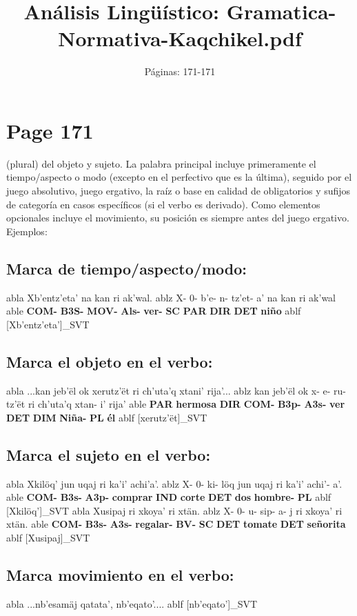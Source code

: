 \documentclass{article}%
\title{Análisis Lingüístico: Gramatica{-}Normativa{-}Kaqchikel.pdf}%
\author{Páginas: 171{-}171}%
\begin{document}
%
\normalsize%
\maketitle%
\section{Page 171}%
\label{sec:Page171}%

%
(plural) del objeto y sujeto. La palabra principal incluye primeramente el tiempo/aspecto %
o modo (excepto en el perfectivo que es la última), seguido por el juego absolutivo, %
juego ergativo, la raíz o base en calidad de obligatorios y sufijos de categoría en casos %
específicos (si el verbo es derivado). Como elementos opcionales incluye el movimiento, %
su posición es siempre antes del juego ergativo. Ejemplos: %
\subsection{Marca de tiempo/aspecto/modo:}%
\label{subsec:Marcadetiempo/aspecto/modo}%

%
\ex
  	abla Xb'entz'eta' na kan ri ak'wal.
  	ablz X- 0- b'e- n- tz'et- a' na kan ri ak'wal
  	able \textbf{COM-} \textbf{B3S-} \textbf{MOV-} \textbf{Als-} \textbf{ver-} \textbf{SC} \textbf{PAR} \textbf{DIR} \textbf{DET} \textbf{niño}
  	ablf [Xb'entz'eta']_{SVT}
\subsection{Marca el objeto en el verbo:}%
\label{subsec:Marcaelobjetoenelverbo}%

%
\ex
  	abla ...kan jeb'ël ok xerutz'ët ri ch'uta'q xtani' rija'...
  	ablz kan jeb'ël ok x- e- ru- tz'ët ri ch'uta'q xtan- i' rija'
  	able \textbf{PAR} \textbf{hermosa} \textbf{DIR} \textbf{COM-} \textbf{B3p-} \textbf{A3s-} \textbf{ver} \textbf{DET} \textbf{DIM} \textbf{Niña-} \textbf{PL} \textbf{él}
  	ablf [xerutz'ët]_{SVT}
\subsection{Marca el sujeto en el verbo:}%
\label{subsec:Marcaelsujetoenelverbo}%

%
\ex
  	abla Xkilöq' jun uqaj ri ka'i' achi'a'.
  	ablz X- 0- ki- löq jun uqaj ri ka'i' achi'- a'.
  	able \textbf{COM-} \textbf{B3s-} \textbf{A3p-} \textbf{comprar} \textbf{IND} \textbf{corte} \textbf{DET} \textbf{dos} \textbf{hombre-} \textbf{PL}
  	ablf [Xkilöq']_{SVT}
\ex
  	abla Xusipaj ri xkoya' ri xtän.
  	ablz X- 0- u- sip- a- j ri xkoya' ri xtän.
  	able \textbf{COM-} \textbf{B3s-} \textbf{A3s-} \textbf{regalar-} \textbf{BV-} \textbf{SC} \textbf{DET} \textbf{tomate} \textbf{DET} \textbf{señorita}
  	ablf [Xusipaj]_{SVT}
\subsection{Marca movimiento en el verbo:}%
\label{subsec:Marcamovimientoenelverbo}%

%
\ex
  	abla ...nb'esamäj qatata', nb'eqato'....
  	ablf [nb'eqato']_{SVT}
\end{document}
